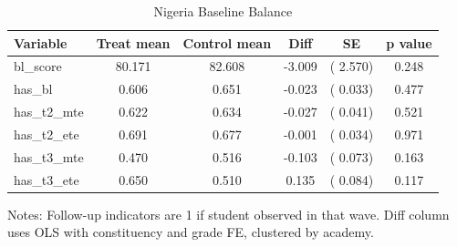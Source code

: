 \begin{table}[!htbp]
\centering
\caption{Nigeria Baseline Balance}
\label{tab:ng_balance}
\begin{threeparttable}
\begin{tabular}[t]{lccccc}
\toprule
Variable & Treat mean & Control mean & Diff & SE & p value \\
\midrule
bl\_score &  80.171 &  82.608 &  -3.009 & (  2.570) & 0.248 \\
has\_bl &   0.606 &   0.651 &  -0.023 & (  0.033) & 0.477 \\
has\_t2\_mte &   0.622 &   0.634 &  -0.027 & (  0.041) & 0.521 \\
has\_t2\_ete &   0.691 &   0.677 &  -0.001 & (  0.034) & 0.971 \\
has\_t3\_mte &   0.470 &   0.516 &  -0.103 & (  0.073) & 0.163 \\
has\_t3\_ete &   0.650 &   0.510 &   0.135 & (  0.084) & 0.117 \\
\bottomrule
\end{tabular}
\begin{tablenotes}[para]
\item Notes: Follow-up indicators are 1 if student observed in that wave. 
Diff column uses OLS with constituency and grade FE, clustered by academy.
\end{tablenotes}
\end{threeparttable}
\end{table}
